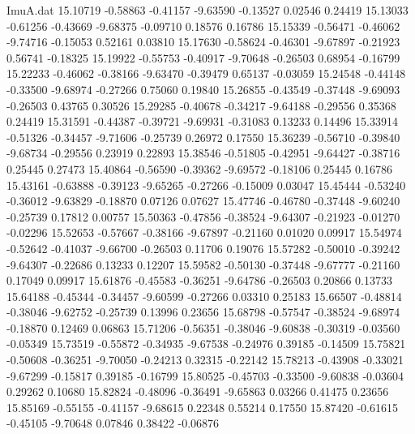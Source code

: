 \begin{filecontents}{ImuA.dat}
  15.10719   -0.58863   -0.41157   -9.63590   -0.13527    0.02546    0.24419
  15.13033   -0.61256   -0.43669   -9.68375   -0.09710    0.18576    0.16786
  15.15339   -0.56471   -0.46062   -9.74716   -0.15053    0.52161    0.03810
  15.17630   -0.58624   -0.46301   -9.67897   -0.21923    0.56741   -0.18325
  15.19922   -0.55753   -0.40917   -9.70648   -0.26503    0.68954   -0.16799
  15.22233   -0.46062   -0.38166   -9.63470   -0.39479    0.65137   -0.03059
  15.24548   -0.44148   -0.33500   -9.68974   -0.27266    0.75060    0.19840
  15.26855   -0.43549   -0.37448   -9.69093   -0.26503    0.43765    0.30526
  15.29285   -0.40678   -0.34217   -9.64188   -0.29556    0.35368    0.24419
  15.31591   -0.44387   -0.39721   -9.69931   -0.31083    0.13233    0.14496
  15.33914   -0.51326   -0.34457   -9.71606   -0.25739    0.26972    0.17550
  15.36239   -0.56710   -0.39840   -9.68734   -0.29556    0.23919    0.22893
  15.38546   -0.51805   -0.42951   -9.64427   -0.38716    0.25445    0.27473
  15.40864   -0.56590   -0.39362   -9.69572   -0.18106    0.25445    0.16786
  15.43161   -0.63888   -0.39123   -9.65265   -0.27266   -0.15009    0.03047
  15.45444   -0.53240   -0.36012   -9.63829   -0.18870    0.07126    0.07627
  15.47746   -0.46780   -0.37448   -9.60240   -0.25739    0.17812    0.00757
  15.50363   -0.47856   -0.38524   -9.64307   -0.21923   -0.01270   -0.02296
  15.52653   -0.57667   -0.38166   -9.67897   -0.21160    0.01020    0.09917
  15.54974   -0.52642   -0.41037   -9.66700   -0.26503    0.11706    0.19076
  15.57282   -0.50010   -0.39242   -9.64307   -0.22686    0.13233    0.12207
  15.59582   -0.50130   -0.37448   -9.67777   -0.21160    0.17049    0.09917
  15.61876   -0.45583   -0.36251   -9.64786   -0.26503    0.20866    0.13733
  15.64188   -0.45344   -0.34457   -9.60599   -0.27266    0.03310    0.25183
  15.66507   -0.48814   -0.38046   -9.62752   -0.25739    0.13996    0.23656
  15.68798   -0.57547   -0.38524   -9.68974   -0.18870    0.12469    0.06863
  15.71206   -0.56351   -0.38046   -9.60838   -0.30319   -0.03560   -0.05349
  15.73519   -0.55872   -0.34935   -9.67538   -0.24976    0.39185   -0.14509
  15.75821   -0.50608   -0.36251   -9.70050   -0.24213    0.32315   -0.22142
  15.78213   -0.43908   -0.33021   -9.67299   -0.15817    0.39185   -0.16799
  15.80525   -0.45703   -0.33500   -9.60838   -0.03604    0.29262    0.10680
  15.82824   -0.48096   -0.36491   -9.65863    0.03266    0.41475    0.23656
  15.85169   -0.55155   -0.41157   -9.68615    0.22348    0.55214    0.17550
  15.87420   -0.61615   -0.45105   -9.70648    0.07846    0.38422   -0.06876

\end{filecontents}
